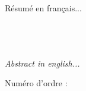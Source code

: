 \documentclass[a4paper,11pt]{book}
\begin{document}
\addtocounter{page}{-1}

\markboth{}{}
\pagestyle{empty}
\setmarginsrb{10mm}{10mm}{10mm}{10mm}{11pt}{11mm}{0pt}{11mm}

\footnotesize
\begin{minipage}[t]{0.45\textwidth}
\vspace{-1cm}
\section*{}

\par Résumé en français...

\end{minipage}
\begin{minipage}[t]{0.03\textwidth}
~
\end{minipage}
\begin{minipage}[t]{0.45\textwidth}
\vspace{-1cm}
\section*{}

\par \emph{Abstract in english...}

\end{minipage}

\vfill

\hfill Numéro d'ordre : \NOORDRE
\end{document}
